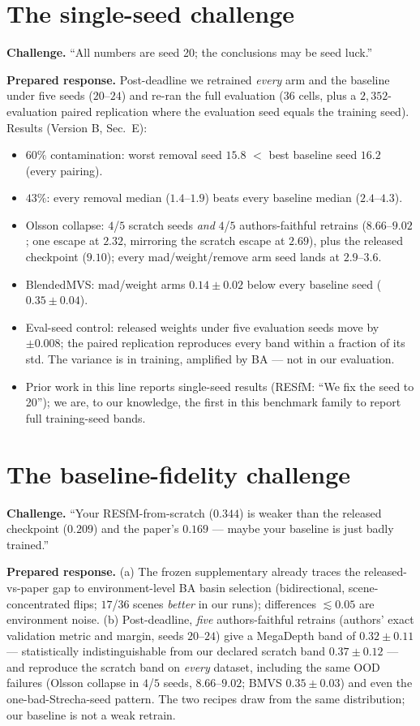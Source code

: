 \documentclass[10pt,letterpaper]{article}
\begin{document}
\section{The single-seed challenge}
\textbf{Challenge.} ``All numbers are seed 20; the conclusions may be seed luck.''

\textbf{Prepared response.} Post-deadline we retrained \emph{every} arm and the baseline
under five seeds ($20$--$24$) and re-ran the full evaluation ($36$ cells, plus a
$2{,}352$-evaluation paired replication where the evaluation seed equals the training
seed). Results (Version B, Sec.~E):
\begin{itemize}\itemsep2pt
\item $60\%$ contamination: worst removal seed $15.8$ $<$ best baseline seed $16.2$
(every pairing).
\item $43\%$: every removal median ($1.4$--$1.9$) beats every baseline median
($2.4$--$4.3$).
\item Olsson collapse: $4$/$5$ scratch seeds \emph{and} $4$/$5$ authors-faithful
retrains ($8.66$--$9.02$; one escape at $2.32$, mirroring the scratch escape at $2.69$),
plus the released checkpoint ($9.10$); every mad/weight/remove arm seed lands at
$2.9$--$3.6$.
\item BlendedMVS: mad/weight arms $0.14\pm0.02$ below every baseline seed
($0.35\pm0.04$).
\item Eval-seed control: released weights under five evaluation seeds move by
$\pm0.008$; the paired replication reproduces every band within a fraction of its std.
The variance is in training, amplified by BA --- not in our evaluation.
\item Prior work in this line reports single-seed results (RESfM: ``We fix the seed to
20''); we are, to our knowledge, the first in this benchmark family to report full
training-seed bands.
\end{itemize}

\section{The baseline-fidelity challenge}
\textbf{Challenge.} ``Your RESfM-from-scratch ($0.344$) is weaker than the released
checkpoint ($0.209$) and the paper's $0.169$ --- maybe your baseline is just badly
trained.''

\textbf{Prepared response.} (a) The frozen supplementary already traces the
released-vs-paper gap to environment-level BA basin selection (bidirectional,
scene-concentrated flips; $17$/$36$ scenes \emph{better} in our runs); differences
$\lesssim0.05$ are environment noise. (b) Post-deadline, \emph{five} authors-faithful
retrains (authors' exact validation metric and margin, seeds $20$--$24$) give a MegaDepth
band of $0.32\pm0.11$ --- statistically indistinguishable from our declared scratch band
$0.37\pm0.12$ --- and reproduce the scratch band on \emph{every} dataset, including the
same OOD failures (Olsson collapse in $4$/$5$ seeds, $8.66$--$9.02$; BMVS
$0.35\pm0.03$) and even the one-bad-Strecha-seed pattern. The two recipes draw from the
same distribution; our baseline is not a weak retrain.
\end{document}
